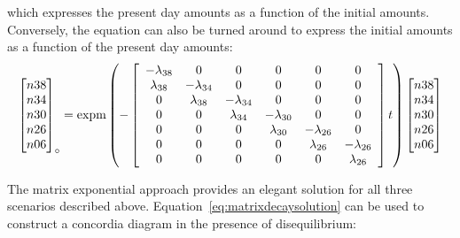 \begin{refsection}
\noindent which expresses the present day amounts as a function of the
initial amounts. Conversely, the equation can also be turned around to
express the initial amounts as a function of the present day amounts:
\begin{equation}
  \left[
    \begin{array}{@{}c@{}}
      n38\\
      n34\\
      n30\\
      n26\\
      n06
    \end{array}
  \right]_\circ
  =
  \mbox{expm}\left(
      -
  \left[
    \begin{array}{cccccc}
      -\lambda_{38} & 0 & 0 & 0 & 0 & 0 \\
      \lambda_{38} & -\lambda_{34} & 0 & 0 & 0 & 0 \\
      0 & \lambda_{38} & -\lambda_{34} & 0 & 0 & 0 \\
      0 & 0 & \lambda_{34} & -\lambda_{30} & 0 & 0 \\
      0 & 0 & 0 & \lambda_{30} & -\lambda_{26} & 0 \\
      0 & 0 & 0 & 0 & \lambda_{26} & -\lambda_{26} \\
      0 & 0 & 0 & 0 & 0 & \lambda_{26}\\
    \end{array}
    \right]
  t
  \right)
  \left[
    \begin{array}{@{}c@{}}
      n38\\
      n34\\
      n30\\
      n26\\
      n06
    \end{array}
    \right]
  \label{eq:matrixdecaysolutioninverse}
\end{equation}

The matrix exponential approach provides an elegant solution for all
three scenarios described above. Equation~\ref{eq:matrixdecaysolution}
can be used to construct a concordia diagram in the presence of
disequilibrium:\\


\end{refsection}
